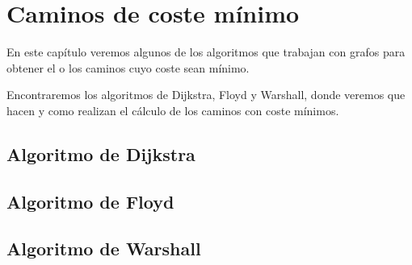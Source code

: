 \chapter{Caminos de coste mínimo}
En este capítulo veremos algunos de los algoritmos que trabajan con grafos para obtener el o los caminos cuyo coste sean mínimo.

Encontraremos los algoritmos de Dijkstra, Floyd y Warshall, donde veremos que hacen y como realizan el cálculo de los caminos con coste mínimos.

\section{Algoritmo de Dijkstra}

\section{Algoritmo de Floyd}

\section{Algoritmo de Warshall}

